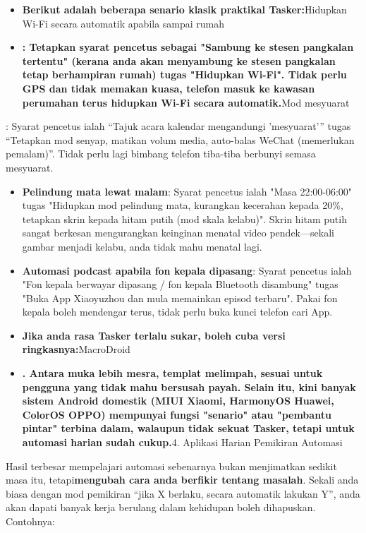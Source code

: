 \begin{itemize}
  \item \textbf{Berikut adalah beberapa senario klasik praktikal Tasker:}Hidupkan Wi-Fi secara automatik apabila sampai rumah
  \item \textbf{: Tetapkan syarat pencetus sebagai "Sambung ke stesen pangkalan tertentu" (kerana anda akan menyambung ke stesen pangkalan tetap berhampiran rumah) tugas "Hidupkan Wi-Fi". Tidak perlu GPS dan tidak memakan kuasa, telefon masuk ke kawasan perumahan terus hidupkan Wi-Fi secara automatik.}Mod mesyuarat
\end{itemize}

: Syarat pencetus ialah “Tajuk acara kalendar mengandungi 'mesyuarat'” tugas “Tetapkan mod senyap, matikan volum media, auto-balas WeChat (memerlukan pemalam)”. Tidak perlu lagi bimbang telefon tiba-tiba berbunyi semasa mesyuarat.

\begin{itemize}
  \item \textbf{Pelindung mata lewat malam}: Syarat pencetus ialah "Masa 22:00-06:00" tugas "Hidupkan mod pelindung mata, kurangkan kecerahan kepada 20\%, tetapkan skrin kepada hitam putih (mod skala kelabu)". Skrin hitam putih sangat berkesan mengurangkan keinginan menatal video pendek—sekali gambar menjadi kelabu, anda tidak mahu menatal lagi.
  \item \textbf{Automasi podcast apabila fon kepala dipasang}: Syarat pencetus ialah "Fon kepala berwayar dipasang / fon kepala Bluetooth disambung" tugas "Buka App Xiaoyuzhou dan mula memainkan episod terbaru". Pakai fon kepala boleh mendengar terus, tidak perlu buka kunci telefon cari App.
  \item \textbf{Jika anda rasa Tasker terlalu sukar, boleh cuba versi ringkasnya:}MacroDroid
  \item \textbf{. Antara muka lebih mesra, templat melimpah, sesuai untuk pengguna yang tidak mahu bersusah payah. Selain itu, kini banyak sistem Android domestik (MIUI Xiaomi, HarmonyOS Huawei, ColorOS OPPO) mempunyai fungsi "senario" atau "pembantu pintar" terbina dalam, walaupun tidak sekuat Tasker, tetapi untuk automasi harian sudah cukup.}4. Aplikasi Harian Pemikiran Automasi
\end{itemize}

Hasil terbesar mempelajari automasi sebenarnya bukan menjimatkan sedikit masa itu, tetapi\textbf{mengubah cara anda berfikir tentang masalah}. Sekali anda biasa dengan mod pemikiran “jika X berlaku, secara automatik lakukan Y”, anda akan dapati banyak kerja berulang dalam kehidupan boleh dihapuskan. Contohnya:

